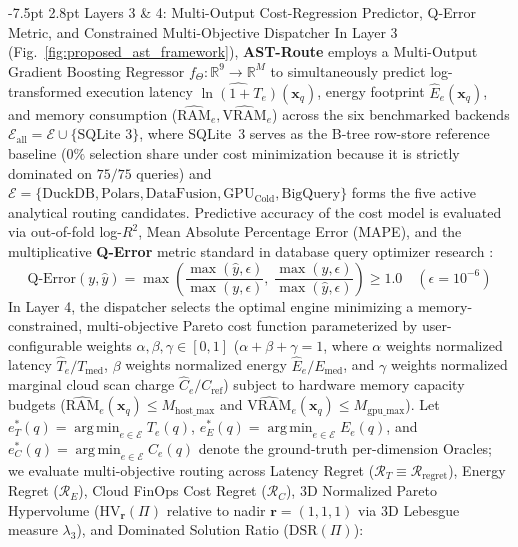 \documentclass[10pt,a4paper]{article}
\makeatletter
\renewcommand\subsection{\@startsection{subsection}{2}{\z@}%
  {-7.5pt \@plus -2pt \@minus -1pt}%
  {2.8pt \@plus 1pt}%
  {\normalfont\normalsize\bfseries}}
\makeatother
\begin{document}
\subsection{Layers 3 \& 4: Multi-Output Cost-Regression Predictor, Q-Error Metric, and Constrained Multi-Objective Dispatcher}
In Layer 3 (Fig.~\ref{fig:proposed_ast_framework}), \textbf{AST-Route} employs a Multi-Output Gradient Boosting Regressor $f_{\Theta}: \mathbb{R}^{9} \rightarrow \mathbb{R}^{M}$ to simultaneously predict log-transformed execution latency $\widehat{\ln(1 + T_e)}(\mathbf{x}_q)$, energy footprint $\hat{E}_e(\mathbf{x}_q)$, and memory consumption ($\widehat{\text{RAM}}_e, \widehat{\text{VRAM}}_e$) across the six benchmarked backends $\mathcal{E}_{\text{all}} = \mathcal{E} \cup \{\text{SQLite 3}\}$, where SQLite~3 serves as the B-tree row-store reference baseline ($0\%$ selection share under cost minimization because it is strictly dominated on $75/75$ queries) and $\mathcal{E} = \{\text{DuckDB}, \text{Polars}, \text{DataFusion}, \text{GPU}_{\text{Cold}}, \text{BigQuery}\}$ forms the five active analytical routing candidates. Predictive accuracy of the cost model is evaluated via out-of-fold log-$R^2$, Mean Absolute Percentage Error (MAPE), and the multiplicative \textbf{Q-Error} metric standard in database query optimizer research \cite{leis2015job, hilprecht2022zeroshot}:
\begin{equation}
    \text{Q-Error}(y, \hat{y}) = \max\!\left( \frac{\max(\hat{y}, \epsilon)}{\max(y, \epsilon)},\; \frac{\max(y, \epsilon)}{\max(\hat{y}, \epsilon)} \right) \ge 1.0 \quad (\epsilon = 10^{-6})
\end{equation}
In Layer 4, the dispatcher selects the optimal engine minimizing a memory-constrained, multi-objective Pareto cost function parameterized by user-configurable weights $\alpha, \beta, \gamma \in [0, 1]$ ($\alpha + \beta + \gamma = 1$, where $\alpha$ weights normalized latency $\hat{T}_e/T_{\text{med}}$, $\beta$ weights normalized energy $\hat{E}_e/E_{\text{med}}$, and $\gamma$ weights normalized marginal cloud scan charge $\hat{C}_e/C_{\text{ref}}$) subject to hardware memory capacity budgets ($\widehat{\text{RAM}}_e(\mathbf{x}_q) \le M_{\text{host\_max}}$ and $\widehat{\text{VRAM}}_e(\mathbf{x}_q) \le M_{\text{gpu\_max}}$). Let $e_T^*(q) = \operatorname*{arg\,min}_{e \in \mathcal{E}} T_e(q)$, $e_E^*(q) = \operatorname*{arg\,min}_{e \in \mathcal{E}} E_e(q)$, and $e_C^*(q) = \operatorname*{arg\,min}_{e \in \mathcal{E}} C_e(q)$ denote the ground-truth per-dimension Oracles; we evaluate multi-objective routing across Latency Regret ($\mathcal{R}_T \equiv \mathcal{R}_{\text{regret}}$), Energy Regret ($\mathcal{R}_E$), Cloud FinOps Cost Regret ($\mathcal{R}_C$), 3D Normalized Pareto Hypervolume ($\text{HV}_{\mathbf{r}}(\Pi)$ relative to nadir $\mathbf{r}=(1,1,1)$ via 3D Lebesgue measure $\lambda_3$), and Dominated Solution Ratio ($\text{DSR}(\Pi)$):
\end{document}
